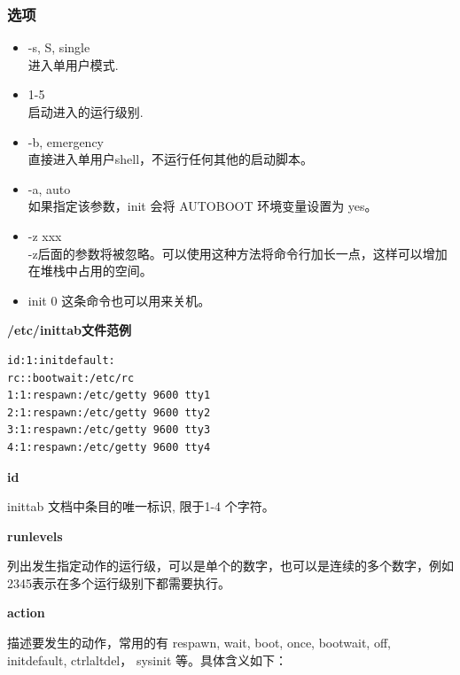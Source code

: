 \subsubsection{选项}

\begin{itemize}
\item
  -s, S, single\\ 进入单用户模式.
\item
  1-5\\ 启动进入的运行级别.
\item
  -b, emergency\\ 直接进入单用户shell，不运行任何其他的启动脚本。
\item
  -a, auto\\ 如果指定该参数，init 会将 AUTOBOOT 环境变量设置为 yes。
\item
  -z xxx\\
  -z后面的参数将被忽略。可以使用这种方法将命令行加长一点，这样可以增加在堆栈中占用的空间。
\item
  init 0 这条命令也可以用来关机。
\end{itemize}
\textbf{/etc/inittab文件范例}

{\begin{shaded}\begin{verbatim}
id:1:initdefault:
rc::bootwait:/etc/rc
1:1:respawn:/etc/getty 9600 tty1
2:1:respawn:/etc/getty 9600 tty2
3:1:respawn:/etc/getty 9600 tty3
4:1:respawn:/etc/getty 9600 tty4
\end{verbatim}\end{shaded}}
\textbf{id}

inittab 文档中条目的唯一标识, 限于1-4 个字符。

\textbf{runlevels}

列出发生指定动作的运行级，可以是单个的数字，也可以是连续的多个数字，例如2345表示在多个运行级别下都需要执行。

\textbf{action}

描述要发生的动作，常用的有 respawn, wait, boot, once, bootwait, off,
initdefault, ctrlaltdel， sysinit 等。具体含义如下：

